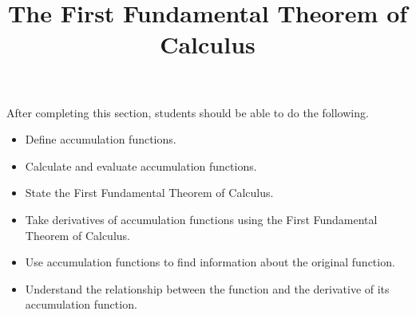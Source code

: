 \documentclass{ximera}
\title{The First Fundamental Theorem of Calculus}
\begin{document}
\begin{abstract}
\end{abstract}

\maketitle

\begin{sectionOutcomes}

After completing this section, students should be able to do the following.

\begin{itemize}
	\item Define accumulation functions.
	\item Calculate and evaluate accumulation functions.
	\item State the First Fundamental Theorem of Calculus.
	\item Take derivatives of accumulation functions using the First Fundamental Theorem of Calculus.
	\item Use accumulation functions to find information about the original function.
	\item Understand the relationship between the function and the derivative of its accumulation function.
\end{itemize}

\end{sectionOutcomes}
\end{document}
